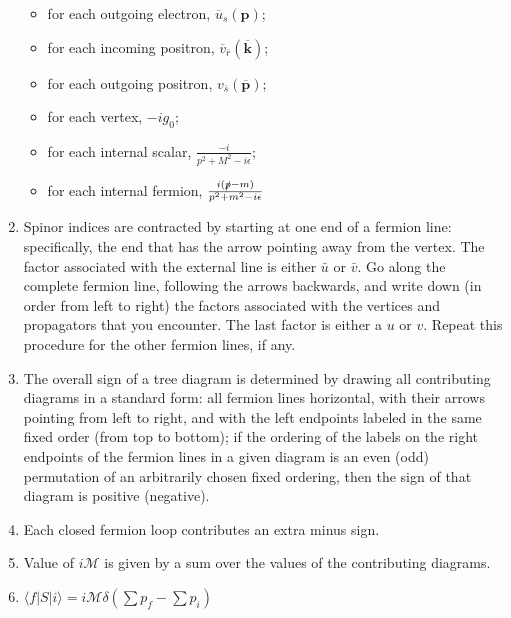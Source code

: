 \begin{enumerate}
\begin{itemize}
\item for each outgoing electron, $\overline{u}_{s}(\bm{p})$;
\item for each incoming positron, $\overline{v}_{\overline{r}}(\overline{\bm{k}})$;
\item for each outgoing positron, $v_{\overline{s}}(\overline{\bm{p}})$;
\item for each vertex, $-ig_0$;
\item for each internal scalar, $\frac{-i}{p^2+M^2-i\epsilon}$;
\item for each internal fermion, $\frac{i(\slashed{p}-m)}{p^2+m^2-i\epsilon}$
\end{itemize}
\item Spinor indices are contracted by starting at one end of a fermion line: specifically, the end that has the arrow pointing away from the vertex. The factor associated with the external line is either $\bar{u}$ or $\bar{v}$. Go along the complete fermion line, following the arrows backwards, and write down (in order from left to right) the factors associated with the vertices and propagators that you encounter. The last factor is either a $u$ or $v$. Repeat this procedure for the other fermion lines, if any.
\item The overall sign of a tree diagram is determined by drawing all contributing diagrams in a standard form: all fermion lines horizontal, with their arrows pointing from left to right, and with the left endpoints labeled in the same fixed order (from top to bottom); if the ordering of the labels on the right endpoints of the fermion lines in a given diagram is an even (odd) permutation of an arbitrarily chosen fixed ordering, then the sign of that diagram is positive (negative).
\item Each closed fermion loop contributes an extra minus sign.
\item Value of $i\mathcal{M}$ is given by a sum over the values of the contributing diagrams.
\item $\langle f | S | i \rangle = i\mathcal{M}\delta(\sum p_f -\sum p_i)$
\end{enumerate}

